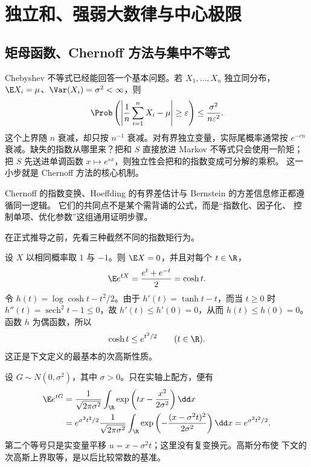\section{独立和、强弱大数律与中心极限}\label{sec:05-04}

\subsection{矩母函数、Chernoff 方法与集中不等式}\label{subsec:5-4-1}

Chebyshev 不等式已经能回答一个基本问题。若 $X_1,\dots,X_n$ 独立同分布，
$\E X_i=\mu$、$\Var(X_i)=\sigma^2<\infty$，则
\[
 \Prob\left(\left|\frac1n\sum_{i=1}^nX_i-\mu\right|\geq\varepsilon\right)
 \leq \frac{\sigma^2}{n\varepsilon^2}.
\]
这个上界随 $n$ 衰减，却只按 $n^{-1}$ 衰减。对有界独立变量，实际尾概率通常按
$e^{-cn}$ 衰减。缺失的指数从哪里来？把和 $S$ 直接放进 Markov 不等式只会使用一阶矩；
把 $S$ 先送进单调函数 $x\mapsto e^{sx}$，则独立性会把和的指数变成可分解的乘积。
这一小步就是 Chernoff 方法的核心机制。

Chernoff 的指数变换、Hoeffding 的有界差估计与 Bernstein 的方差信息修正都遵循同一逻辑。
它们的共同点不是某个需背诵的公式，而是“指数化、因子化、
控制单项、优化参数”这组通用证明步骤。

在正式推导之前，先看三种截然不同的指数矩行为。

\begin{example}[Rademacher]\label{ex:5-4-1-1}
设 $X$ 以相同概率取 $1$ 与 $-1$。则 $\E X=0$，并且对每个 $t\in\R$，
\[
 \E e^{tX}=\frac{e^t+e^{-t}}2=\cosh t.
\]
令 $h(t)=\log\cosh t-t^2/2$。由于
$h'(t)=\tanh t-t$，而当 $t\geq0$ 时
$h''(t)=\operatorname{sech}^2t-1\leq0$，故 $h'(t)\leq h'(0)=0$，从而
$h(t)\leq h(0)=0$。函数 $h$ 为偶函数，所以
\[
 \cosh t\leq e^{t^2/2}\qquad(t\in\R).
\]
这正是下文定义的最基本的次高斯性质。
\end{example}

\begin{example}[高斯分布]\label{ex:5-4-1-2}
设 $G\sim N(0,\sigma^2)$，其中 $\sigma>0$。只在实轴上配方，便有
\begin{align*}
 \E e^{tG}
 &=\frac1{\sqrt{2\pi\sigma^2}}
   \int_{\R}\exp\left(tx-\frac{x^2}{2\sigma^2}\right)\dd x\\
 &=e^{\sigma^2t^2/2}\frac1{\sqrt{2\pi\sigma^2}}
   \int_{\R}\exp\left(-\frac{(x-\sigma^2t)^2}{2\sigma^2}\right)\dd x
 =e^{\sigma^2t^2/2}.
\end{align*}
第二个等号只是实变量平移 $u=x-\sigma^2t$；这里没有复变换元。高斯分布使
下文的次高斯上界取等，是以后比较常数的基准。
\end{example}


